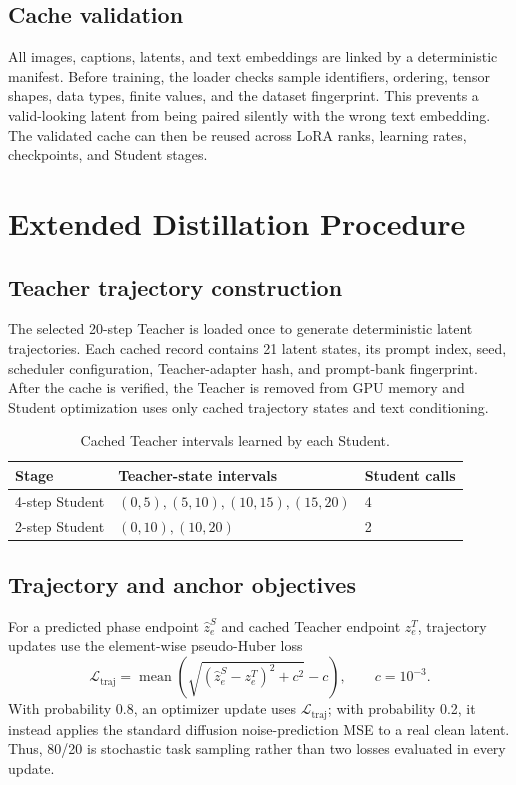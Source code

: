 \documentclass{article}
\begin{document}
\subsection{Cache validation}

All images, captions, latents, and text embeddings are linked by a deterministic
manifest. Before training, the loader checks sample identifiers, ordering,
tensor shapes, data types, finite values, and the dataset fingerprint. This
prevents a valid-looking latent from being paired silently with the wrong text
embedding. The validated cache can then be reused across LoRA ranks, learning
rates, checkpoints, and Student stages.

\section{Extended Distillation Procedure}
\label{app:distillation}

\subsection{Teacher trajectory construction}

The selected 20-step Teacher is loaded once to generate deterministic latent
trajectories. Each cached record contains 21 latent states, its prompt index,
seed, scheduler configuration, Teacher-adapter hash, and prompt-bank
fingerprint. After the cache is verified, the Teacher is removed from GPU
memory and Student optimization uses only cached trajectory states and text
conditioning.

\begin{table}[h]
\centering
\small
\begin{tabular}{lll}
\toprule
\textbf{Stage} & \textbf{Teacher-state intervals} & \textbf{Student calls} \\
\midrule
4-step Student & $(0,5),(5,10),(10,15),(15,20)$ & 4 \\
2-step Student & $(0,10),(10,20)$ & 2 \\
\bottomrule
\end{tabular}
\caption{Cached Teacher intervals learned by each Student.}
\label{tab:appendix-phases}
\end{table}

\subsection{Trajectory and anchor objectives}

For a predicted phase endpoint $\hat z_e^S$ and cached Teacher endpoint
$z_e^T$, trajectory updates use the element-wise pseudo-Huber loss
\begin{equation}
\mathcal{L}_{\mathrm{traj}}
=\operatorname{mean}\!\left(
\sqrt{(\hat z_e^S-z_e^T)^2+c^2}-c
\right),
\qquad c=10^{-3}.
\label{eq:appendix-pseudo-huber}
\end{equation}
With probability 0.8, an optimizer update uses
$\mathcal{L}_{\mathrm{traj}}$; with probability 0.2, it instead applies the
standard diffusion noise-prediction MSE to a real clean latent. Thus, 80/20 is
stochastic task sampling rather than two losses evaluated in every update.
\end{document}
